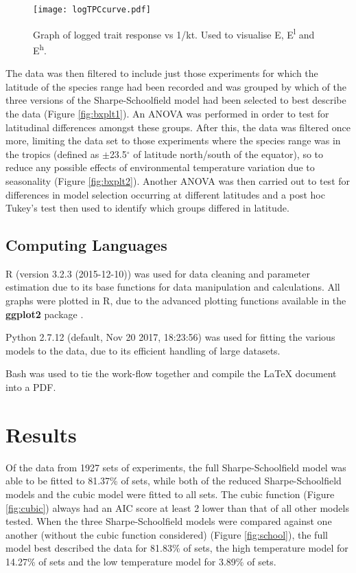 \documentclass[a4paper, 11pt]{article}
\begin{document}
\begin{linenumbers}
\begin{figure}[H]
\centering
\texttt{[image: logTPCcurve.pdf]}
\caption{\label{fig:eg log TPC} Graph of logged trait response vs 1/kt. Used to visualise E, E\textsuperscript{l} and E\textsuperscript{h}.}
\end{figure}



The data was then filtered to include just those experiments for which the latitude of the species range had been recorded and was grouped by which of the three versions of the Sharpe-Schoolfield model had been selected to best describe the data (Figure \ref{fig:bxplt1}). An ANOVA was performed in order to test for latitudinal differences amongst these groups.  After this, the data was filtered once more, limiting the data set to those experiments where the species range was in the tropics (defined as $\pm$23.5$^{\circ}$ of latitude north/south of the equator), so to reduce any possible effects of environmental temperature variation due to seasonality (Figure \ref{fig:bxplt2}). Another ANOVA was then carried out to test for differences in model selection occurring at different latitudes and a post hoc Tukey's test then used to identify which groups differed in latitude.

\subsection{Computing Languages}

R (version 3.2.3 (2015-12-10)) was used for data cleaning and parameter estimation due to its base functions for data manipulation and calculations. All graphs were plotted in R, due to the advanced plotting functions available in the \textbf{ggplot2} package \citep{ggplot}. 

Python 2.7.12 (default, Nov 20 2017, 18:23:56) was used for fitting the various models to the data, due to its efficient handling of large datasets.

Bash was used to tie the work-flow together and compile the LaTeX document into a PDF.

\section{Results}

Of the data from 1927 sets of experiments, the full Sharpe-Schoolfield model was able to be fitted to 81.37\% of sets, while both of the reduced Sharpe-Schoolfield models and the cubic model were fitted to all sets. The cubic function (Figure \ref{fig:cubic}) always had an AIC score at least 2 lower than that of all other models tested. When the three Sharpe-Schoolfield models were compared against one another (without the cubic function considered) (Figure \ref{fig:school}), the full model best described the data for 81.83\% of sets, the high temperature model for 14.27\% of sets and the low temperature model for 3.89\% of sets.




\end{linenumbers}
\end{document}
